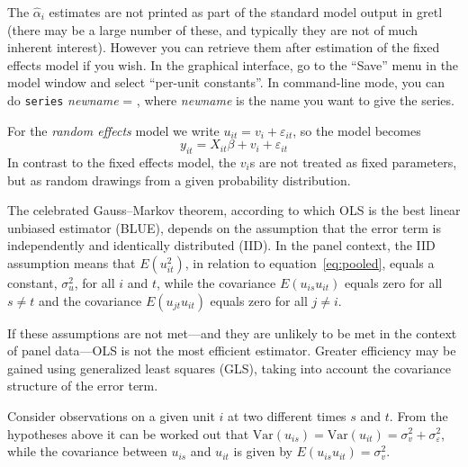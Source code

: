 The $\hat{\alpha}_i$ estimates are not printed as part of the standard
model output in gretl (there may be a large number of these, and
typically they are not of much inherent interest).  However you can
retrieve them after estimation of the fixed effects model if you wish.
In the graphical interface, go to the ``Save'' menu in the model
window and select ``per-unit constants''.  In command-line mode, you
can do \texttt{series} \textsl{newname} = , where
\textsl{newname} is the name you want to give the series.

For the \textsl{random effects} model we write $u_{it} = v_i +
\varepsilon_{it}$, so the model becomes
\begin{equation}
\label{eq:RE}
y_{it} = X_{it}\beta + v_i + \varepsilon_{it}
\end{equation}
In contrast to the fixed effects model, the $v_i$s are not treated as
fixed parameters, but as random drawings from a given probability
distribution.

The celebrated Gauss--Markov theorem, according to which OLS is the
best linear unbiased estimator (BLUE), depends on the assumption that
the error term is independently and identically distributed (IID).  In
the panel context, the IID assumption means that $E(u_{it}^2)$, in
relation to equation~\ref{eq:pooled}, equals a constant, $\sigma^2_u$,
for all $i$ and $t$, while the covariance $E(u_{is} u_{it})$ equals
zero for all $s \neq t$ and the covariance $E(u_{jt} u_{it})$ equals
zero for all $j \neq i$.

If these assumptions are not met---and they are unlikely to be met
in the context of panel data---OLS is not the most efficient
estimator.  Greater efficiency may be gained using generalized least
squares (GLS), taking into account the covariance structure of the
error term.  

Consider observations on a given unit $i$ at two different times
$s$ and $t$. From the hypotheses above it can be worked out that
$\mbox{Var}(u_{is}) = \mbox{Var}(u_{it}) = \sigma^2_{v} +
\sigma^2_{\varepsilon}$, while the covariance between $u_{is}$ and
$u_{it}$ is given by $E(u_{is}u_{it}) = \sigma^2_{v}$.

